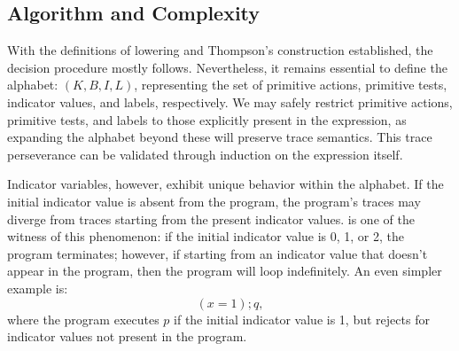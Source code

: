 \subsection{Algorithm and Complexity}

With the definitions of lowering and Thompson's construction established, the decision procedure mostly follows.
Nevertheless, it remains essential to define the alphabet: \((K, B, I, L)\), representing the set of primitive actions, primitive tests, indicator values, and labels, respectively. 
We may safely restrict primitive actions, primitive tests, and labels to those explicitly present in the expression, as expanding the alphabet beyond these will preserve trace semantics. This trace perseverance can be validated through induction on the expression itself.

Indicator variables, however, exhibit unique behavior within the alphabet. If the initial indicator value is absent from the program, the program's traces may diverge from traces starting from the present indicator values.
 is one of the witness of this phenomenon: if the initial indicator value is 0, 1, or 2, the program terminates; however, if starting from an indicator value that doesn't appear in the program, then the program will loop indefinitely. 
An even simpler example is:
\[(x = 1); q,\]
where the program executes \(p\) if the initial indicator value is 1, but rejects for indicator values not present in the program.

